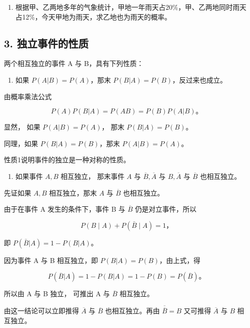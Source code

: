 \begin{enumerate}[start=4]
\item
  根据甲、乙两地多年的气象统计，甲地一年雨天占20\%，甲、乙两地同时雨天占12\%，今天甲地为雨天，求乙地也为雨天的概率。
\end{enumerate}

\subsection{3. 独立事件的性质}

两个相互独立的事件 A 与 B，具有下列性质：

\begin{enumerate}
\item
  如果 \(P(A|B) = P(A)\)，那末 \(P(B|A) = P(B)\)，反过来也成立。
\end{enumerate}

 由概率乘法公式

\[
P (A) P (B | A) = P (A B) = P (B) P (A | B)\text{。}
\]

显然， 如果 \(P(A|B) = P(A)\)， 那末 \(P(B|A) = P(B)\)。

同理，如果 \(P(B|A) = P(B)\)，那末 \(P(A|B) = P(A)\)。

性质1说明事件的独立是一种对称的性质。

\begin{enumerate}[start=2]
\item
  如果事件 \(A, B\) 相互独立， 那末事件 \(A\) 与
  \(\overline{B}, \overline{A}\) 与 \(B, \overline{A}\) 与
  \(\overline{B}\) 也相互独立。
\end{enumerate}

 先证如果 \(A, B\) 相互独立，那末 \(A\) 与
\(\overline{B}\) 也相互独立。

由于在事件 A 发生的条件下，事件 B 与 \(\overline{B}\) 仍是对立事件，所以

\[
P (B \mid A) + P (\bar {B} \mid A) = 1\text{，}
\]

即 \(P(\bar{B}|A) = 1 - P(B|A)\)。

因为事件 A 与 B 相互独立，即 \(P(B|A)=P(B)\)，由上式，得

\[
P (\overline {{{B}}} | A) = 1 - P (B | A) = 1 - P (B) = P (\overline {{{B}}})\text{。}
\]

所以由 A 与 B 独立， 可推出 A 与 \(\overline{B}\) 相互独立。

由这一结论可以立即推得 \(\overline{A}\) 与 \(\overline{B}\)
也相互独立。再由 \(\overline{\overline B}=B\) 又可推得 \(\overline{A}\)
与 \(B\) 相互独立。

